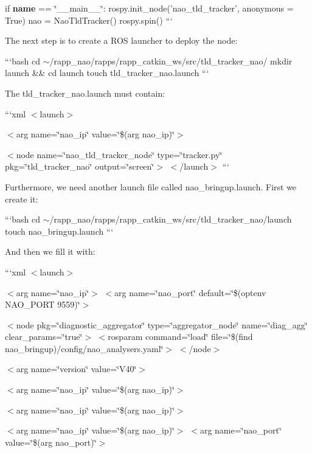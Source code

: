 if {\bfseries name} == \char`\"{}\-\_\-\-\_\-main\-\_\-\-\_\-\char`\"{}\-: rospy.\-init\-\_\-node('nao\-\_\-tld\-\_\-tracker', anonymous = True) nao = Nao\-Tld\-Tracker() rospy.\-spin() ```

The next step is to create a R\-O\-S launcher to deploy the node\-:

```bash cd $\sim$/rapp\-\_\-nao/rapps/rapp\-\_\-catkin\-\_\-ws/src/tld\-\_\-tracker\-\_\-nao/ mkdir launch \&\& cd launch touch tld\-\_\-tracker\-\_\-nao.\-launch ```

The {\ttfamily tld\-\_\-tracker\-\_\-nao.\-launch} must contain\-:

```xml $<$launch$>$

$<$arg name=\char`\"{}nao\-\_\-ip\char`\"{} value=\char`\"{}\$(arg nao\-\_\-ip)\char`\"{}$>$ 

$<$node name=\char`\"{}nao\-\_\-tld\-\_\-tracker\-\_\-node\char`\"{} type=\char`\"{}tracker.\-py\char`\"{} pkg=\char`\"{}tld\-\_\-tracker\-\_\-nao\char`\"{} output=\char`\"{}screen\char`\"{}$>$ $<$/launch$>$ ```

Furthermore, we need another launch file called {\ttfamily nao\-\_\-bringup.\-launch}. First we create it\-:

```bash cd $\sim$/rapp\-\_\-nao/rapps/rapp\-\_\-catkin\-\_\-ws/src/tld\-\_\-tracker\-\_\-nao/launch touch nao\-\_\-bringup.\-launch ```

And then we fill it with\-:

```xml $<$launch$>$

$<$arg name=\char`\"{}nao\-\_\-ip\char`\"{}$>$ $<$arg name=\char`\"{}nao\-\_\-port\char`\"{} default=\char`\"{}\$(optenv N\-A\-O\-\_\-\-P\-O\-R\-T 9559)\char`\"{}$>$

$<$node pkg=\char`\"{}diagnostic\-\_\-aggregator\char`\"{} type=\char`\"{}aggregator\-\_\-node\char`\"{} name=\char`\"{}diag\-\_\-agg\char`\"{} clear\-\_\-params=\char`\"{}true\char`\"{}$>$ $<$rosparam command=\char`\"{}load\char`\"{} file=\char`\"{}\$(find nao\-\_\-bringup)/config/nao\-\_\-analysers.\-yaml\char`\"{}$>$ $<$/node$>$

$<$arg name=\char`\"{}version\char`\"{} value=\char`\"{}\-V40\char`\"{}$>$ 

$<$arg name=\char`\"{}nao\-\_\-ip\char`\"{} value=\char`\"{}\$(arg nao\-\_\-ip)\char`\"{}$>$ 

$<$arg name=\char`\"{}nao\-\_\-ip\char`\"{} value=\char`\"{}\$(arg nao\-\_\-ip)\char`\"{}$>$ 

$<$arg name=\char`\"{}nao\-\_\-ip\char`\"{} value=\char`\"{}\$(arg nao\-\_\-ip)\char`\"{}$>$ $<$arg name=\char`\"{}nao\-\_\-port\char`\"{} value=\char`\"{}\$(arg nao\-\_\-port)\char`\"{}$>$ 

